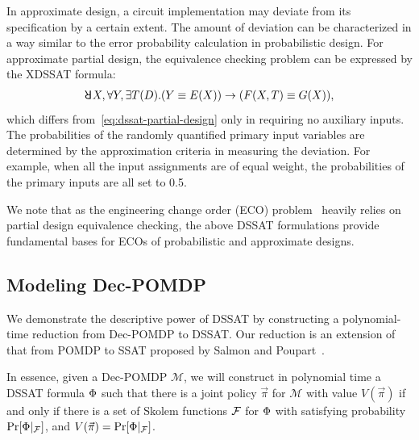 In approximate design,
a circuit implementation may deviate from its specification by a certain extent.
The amount of deviation can be characterized in a way similar to the error probability calculation in probabilistic design.
For approximate partial design,
the equivalence checking problem can be expressed by the XDSSAT formula:
\begin{align}
    \label{eq:dssat-approximate-design}
    \random{} X,\forall Y,\exists T(D).(Y \equiv E(X)) \limply (F(X,T)\equiv G(X)),
\end{align}
which differs from~\cref{eq:dssat-partial-design} only in requiring no auxiliary inputs.
The probabilities of the randomly quantified primary input variables are determined by the approximation criteria in measuring the deviation.
For example, when all the input assignments are of equal weight,
the probabilities of the primary inputs are all set to 0.5.

We note that as the engineering change order (ECO) problem~\cite{JiangDATE20ECOSurvey} heavily relies on partial design equivalence checking,
the above DSSAT formulations provide fundamental bases for ECOs of probabilistic and approximate designs.

\subsection{Modeling Dec-POMDP}
We demonstrate the descriptive power of DSSAT by constructing a polynomial-time reduction from Dec-POMDP to DSSAT.
Our reduction is an extension of that from POMDP to SSAT proposed by Salmon and Poupart~\cite{Salmon2020}.

In essence, given a Dec-POMDP $\mathcal{M}$,
we will construct in polynomial time a DSSAT formula $\Phi$
such that there is a joint policy $\vec{\pi}$ for $\mathcal{M}$ with value $V(\vec{\pi})$
if and only if there is a set of Skolem functions $\mathcal{F}$ for $\Phi$
with satisfying probability $\Pr[\Phi|_{\mathcal{F}}]$, and $V(\vec{\pi})=\Pr[\Phi|_{\mathcal{F}}]$.

